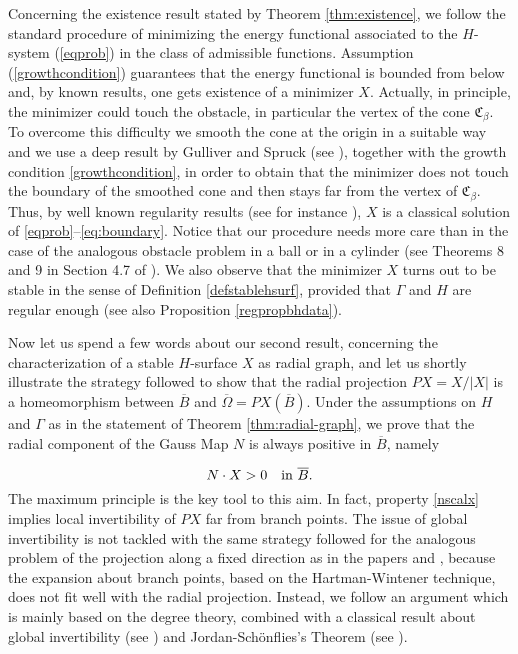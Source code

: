 \documentclass[a4paper,reqno,10pt,oneside]{amsart}
\numberwithin{equation}{section}
\begin{document}
Concerning the existence result stated by Theorem \ref{thm:existence}, we follow the standard procedure of minimizing the energy functional associated to the $H$-system (\ref{eqprob}) in the class of admissible functions. Assumption (\ref{growthcondition}) guarantees that the energy functional is bounded from below and, by known results, one gets existence of a minimizer $X$. Actually, in principle, the minimizer could touch the obstacle, in particular the vertex of the cone $\mathfrak{C}_{\beta}$. To overcome this difficulty we smooth the cone at the origin in a suitable way and we use a deep result by Gulliver and Spruck (see \cite{GulliverSpruck2}), together with the growth condition \eqref{growthcondition}, in order to obtain that the minimizer does not touch the boundary of the smoothed cone and then stays far from the vertex of $\mathfrak{C}_{\beta}$. Thus, by well known regularity results (see for instance \cite{RegMinSurf}), $X$ is a classical solution of \eqref{eqprob}--\eqref{eq:boundary}. Notice that our procedure needs more care than in the case of the analogous obstacle problem in a ball or in a cylinder (see Theorems 8 and 9 in Section 4.7 of \cite{RegMinSurf}). We also observe that the minimizer $X$ turns out to be stable in the sense of Definition \ref{defstablehsurf}, provided that $\Gamma$ and $H$ are regular enough (see also Proposition \ref{regpropbhdata}).
 
Now let us spend a few words about our second result, concerning the characterization of a stable $H$-surface $X$ as radial graph, and let us shortly illustrate the strategy followed to show that the radial projection $PX={X}/{|X|}$ is a homeomorphism between $\overline B$ and $\overline \Omega=PX(\overline{B})$. Under the assumptions on $H$ and $\Gamma$ as in the statement of Theorem \ref{thm:radial-graph}, we prove that the radial component of the Gauss Map $N$ is always positive in $\overline B$, namely
 
 
\begin{equation}\label{nscalx}
N \cdot X>0 \ \ \ \hbox{in} \ \overline B. 
\end{equation}
The maximum principle is the key tool to this aim. In fact, property \eqref{nscalx} implies local invertibility of $PX$ far from branch points. The issue of global invertibility is not tackled with the same strategy followed for the analogous problem of the projection along a fixed direction as in the papers \cite{GulliverSpruck1} and \cite{Sauvigny82}, because the expansion about branch points, based on the Hartman-Wintener technique, does not fit well with the radial projection. Instead, we follow an argument which is mainly based on the degree theory, combined with a classical result about global invertibility (see \cite{AmbrosettiProdi}) and Jordan-Sch\"onflies's Theorem (see \cite{Thomassen}).
\end{document}
